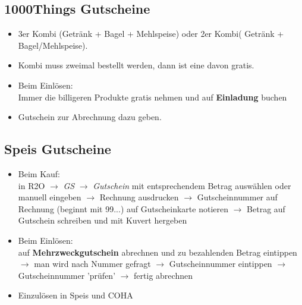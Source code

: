 \documentclass[a4paper,12pt]{article}
\newcounter{row}
\begin{document}
\subsection{1000Things Gutscheine}\label{subsec:1000things}
\begin{itemize}[topsep=0pt, itemsep=0pt, leftmargin=1em]
    \item[=] 3er Kombi (Getränk + Bagel + Mehlspeise) oder 2er Kombi( Getränk + Bagel/Mehlspeise).
    \item[-] Kombi muss zweimal bestellt werden, dann ist eine davon gratis.
    \item[-] Beim Einlösen:\\
    Immer die billigeren Produkte gratis nehmen und auf \textbf{Einladung} buchen
    \item[-] Gutschein zur Abrechnung dazu geben. 
\end{itemize}

\subsection{Speis Gutscheine}\label{subsec:speis}
\begin{itemize}[topsep=0pt, itemsep=0pt, leftmargin=1em]
    \item[-] Beim Kauf:\\
    in R2O $\rightarrow$ \textit{GS} $\rightarrow$ \textit{Gutschein} mit entsprechendem Betrag auswählen oder manuell eingeben $\rightarrow$ Rechnung ausdrucken $\rightarrow$ Gutscheinnummer auf Rechnung (beginnt mit 99...) auf Gutscheinkarte notieren $\rightarrow$ Betrag auf Gutschein schreiben und mit Kuvert hergeben
    \item[-] Beim Einlösen: \\
    auf \textbf{Mehrzweckgutschein} abrechnen und zu bezahlenden Betrag eintippen $\rightarrow$ man wird nach Nummer gefragt $\rightarrow$ Gutscheinnummer eintippen $\rightarrow$ Gutscheinnummer 'prüfen' $\rightarrow$ fertig abrechnen
    \item[-] Einzulösen in Speis und COHA
\end{itemize}

\end{document}
